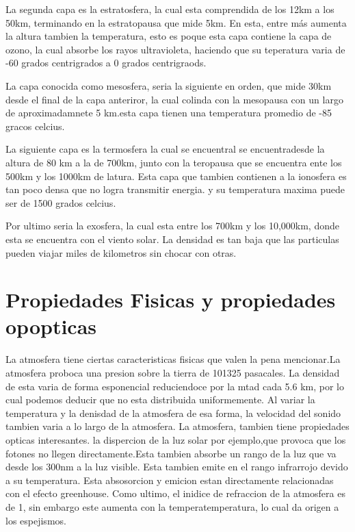 \documentclass{article}
\begin{document}
La segunda capa es la estratosfera, la cual esta comprendida de los 12km a los 50km, terminando en la estratopausa que mide 5km. En esta, entre más aumenta la altura tambien la temperatura, esto es poque esta capa contiene la capa de ozono, la cual absorbe los rayos ultravioleta, haciendo que su teperatura varia de -60 grados centrigrados a 0 grados centrigraods.
\linebreak


La capa conocida como mesosfera, seria la siguiente en orden, que mide 30km desde el final de la capa anteriror, la cual colinda con la mesopausa con un largo de aproximadamnete 5 km.esta capa tienen una temperatura promedio de -85 gracos celcius. 
\linebreak

La siguiente capa es la termosfera la cual se encuentral se encuentradesde la altura de 80 km a la de 700km, junto con la teropausa que se encuentra ente los 500km y los 1000km de latura. Esta capa que tambien contienen a la ionosfera es tan poco densa que no logra transmitir energia. y su temperatura maxima puede ser de 1500 grados celcius. 
\linebreak

Por ultimo seria la exosfera, la cual esta entre los 700km  y los 10,000km, donde esta se encuentra con el viento solar. La densidad es tan baja que las particulas pueden viajar miles de kilometros sin chocar con otras.
\linebreak

\section{Propiedades Fisicas y propiedades opopticas}

La atmosfera tiene ciertas caracteristicas fisicas que valen la pena mencionar.La atmosfera proboca una presion sobre la tierra de 101325 pasacales. La densidad de esta varia de forma esponencial reduciendoce por la mtad cada 5.6 km, por lo cual podemos deducir que no esta distribuida uniformemente.  Al variar la temperatura y la denisdad de la atmosfera de esa forma, la velocidad del sonido tambien varia a lo largo de la atmosfera.
\linebreak
La atmosfera, tambien tiene propiedades opticas interesantes. la dispercion de la luz solar por ejemplo,que provoca que los fotones no llegen directamente.Esta tambien absorbe un rango de la luz que va desde los 300nm a la luz visible. Esta tambien emite en el rango infrarrojo devido a su temperatura. Esta absosorcion y emicion estan directamente relacionadas con el efecto greenhouse. Como ultimo, el inidice de refraccion de la atmosfera es de 1, sin embargo este aumenta con la temperatemperatura, lo cual da origen a los espejismos.
\end{document}
